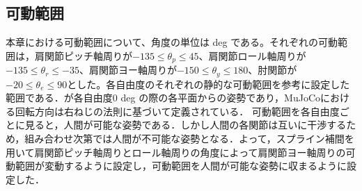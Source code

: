 \begin{small}
\subsection{可動範囲}
本章における可動範囲について、角度の単位は deg である。それぞれの可動範囲は，肩関節ピッチ軸周りが$-135\leq\theta_{p}\leq45$、肩関節ロール軸周りが$-135\leq\theta_{r}\leq-35$、肩関節ヨー軸周りが$-150\leq\theta_{y}\leq180$、肘関節が$-20\leq\theta_{e}\leq90$とした。各自由度のそれぞれの静的な可動範囲\cite{range}を参考に設定した範囲である．が各自由度0 deg の際の各平面からの姿勢であり，MuJoCoにおける回転方向は右ねじの法則に基づいて定義されている．
可動範囲を各自由度ごとに見ると，人間が可能な姿勢である．しかし人間の各関節は互いに干渉するため，組み合わせ次第では人間が不可能な姿勢となる．よって，スプライン補間\cite{spline}を用いて肩関節ピッチ軸周りとロール軸周りの角度によって肩関節ヨー軸周りの可動範囲が変動するように設定し，可動範囲を人間が可能な姿勢に収まるように設定した．

\end{small}
